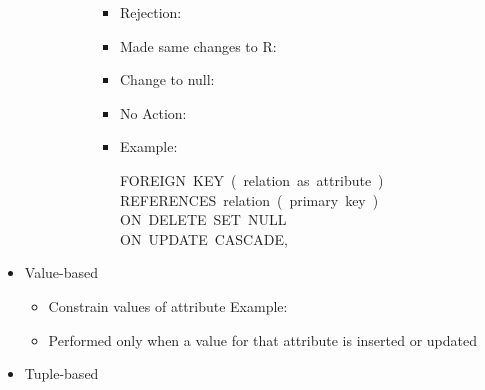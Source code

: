 \documentclass{article}
\begin{document}
\begin{itemize}
\begin{itemize}
\begin{itemize}[noitemsep,topsep=\mdcompacttopsep]
\begin{itemize}[noitemsep,topsep=\mdcompacttopsep]
\begin{itemize}[noitemsep,topsep=\mdcompacttopsep]
\item{}Rejection: %

\item{}Made same changes to R: 

\item{}Change to null: %

\item{}No Action: %

\item{}Example: 
\begin{mdpre}%
\noindent FOREIGN~KEY~(~relation~as~attribute~)\\
REFERENCES~relation~(~primary~key~)\\
ON~DELETE~SET~NULL\\
ON~UPDATE~CASCADE,%
\end{mdpre}%
\end{itemize}%
\end{itemize}%
\end{itemize}%
\end{itemize}%

\item{}
Value-based%

\begin{itemize}[noitemsep,topsep=\mdcompacttopsep]%

\item{}Constrain values of attribute\mdbr
{}Example:~%

\item{}Performed only when a value for 
that attribute is inserted or updated%
\end{itemize}%

\item{}
Tuple-based%

\begin{itemize}[noitemsep,topsep=\mdcompacttopsep]%


\end{itemize}
\end{itemize}
\end{document}
